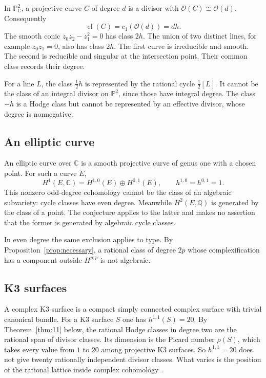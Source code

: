 \documentclass[11pt,reqno]{amsart}
\theoremstyle{definition}
\theoremstyle{remark}
\numberwithin{equation}{section}
\newcommand{\C}{\mathbb{C}}
\newcommand{\Q}{\mathbb{Q}}
\newcommand{\PP}{\mathbb{P}}
\newcommand{\OO}{\mathcal{O}}
\DeclareMathOperator{\cl}{cl}
\begin{document}
In $\PP^2_{\C}$, a projective curve $C$ of degree $d$ is a divisor with
$\OO(C)\cong\OO(d)$. Consequently
\[
 \cl(C)=c_1(\OO(d))=d h.
\]
The smooth conic $z_0z_2-z_1^2=0$ has class $2h$. The union of two
distinct lines, for example $z_0z_1=0$, also has class $2h$. The first
curve is irreducible and smooth. The second is reducible and singular at
the intersection point. Their common class records their degree.

For a line $L$, the class $\tfrac12h$ is represented by the rational cycle
$\tfrac12[L]$. It cannot be the class of an integral divisor on $\PP^2$,
since those have integral degree. The class $-h$ is a Hodge class but
cannot be represented by an effective divisor, whose degree is nonnegative.

\subsection{An elliptic curve}

An elliptic curve over $\C$ is a smooth projective curve of genus one
with a chosen point. For such a curve $E$,
\[
 H^1(E,\C)=H^{1,0}(E)\oplus H^{0,1}(E),
 \qquad h^{1,0}=h^{0,1}=1.
\]
This nonzero odd-degree cohomology cannot be the class of an algebraic
subvariety: cycle classes have even degree. Meanwhile $H^2(E,\Q)$ is
generated by the class of a point. The conjecture applies to the latter
and makes no assertion that the former is generated by algebraic cycle
classes.

In even degree the same exclusion applies to type. By
Proposition~\ref{prop:necessary}, a rational class of degree $2p$ whose
complexification has a component outside $H^{p,p}$ is not algebraic.

\subsection{K3 surfaces}

A complex K3 surface is a compact simply connected complex surface with
trivial canonical bundle. For a K3 surface $S$ one has $h^{1,1}(S)=20$. By
Theorem~\ref{thm:11} below, the rational Hodge classes in degree two are
the rational span of divisor classes. Its dimension is the Picard number
$\rho(S)$, which takes every value from $1$ to $20$ among projective K3
surfaces. So $h^{1,1}=20$ does not give twenty rationally independent
divisor classes. What varies is the position of the rational lattice inside
complex cohomology \cite{voisin2002hodge,huybrechts2016k3}.
\end{document}
